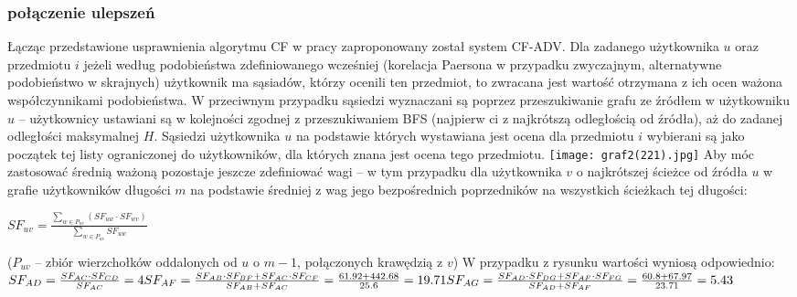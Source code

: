 \documentclass{pracamgr}
\begin{document}
    \subsubsection{połączenie ulepszeń}
     Łącząc przedstawione usprawnienia algorytmu CF w pracy \cite{221} zaproponowany został system CF-ADV.\newline
     Dla zadanego użytkownika $u$ oraz przedmiotu $i$ jeżeli według podobieństwa zdefiniowanego wcześniej
     (korelacja Paersona w przypadku zwyczajnym, alternatywne podobieństwo w skrajnych) użytkownik ma sąsiadów, którzy ocenili ten przedmiot,
     to zwracana jest wartość otrzymana z ich ocen ważona współczynnikami podobieństwa.\newline
     W przeciwnym przypadku sąsiedzi wyznaczani są poprzez przeszukiwanie grafu ze źródłem w użytkowniku $u$
     -- użytkownicy ustawiani są w kolejności zgodnej z przeszukiwaniem BFS (najpierw ci z najkrótszą odległością od źródła),
     aż do zadanej odległości maksymalnej $H$.
     Sąsiedzi użytkownika $u$ na podstawie których wystawiana jest ocena dla przedmiotu $i$
     wybierani są jako początek tej listy ograniczonej do użytkowników, dla których znana jest ocena tego przedmiotu.\newline
     \texttt{[image: graf2(221).jpg]}\newline
     Aby móc zastosować średnią ważoną pozostaje jeszcze zdefiniować wagi
     -- w tym przypadku dla użytkownika $v$ o najkrótszej ścieżce od źródła $u$ w grafie użytkowników długości $m$
     na podstawie średniej z wag jego bezpośrednich poprzedników na wszystkich ścieżkach tej długości:
     \begin{center}
      $SF_{uv}=\frac{\sum_{w\in P_{uv}}(SF_{uw}\cdot SF_{wv})}{\sum_{w\in P_{uv}}SF_{uw}}$
     \end{center}
     {\scriptsize
      ($P_{uv}$ -- zbiór wierzchołków oddalonych od $u$ o $m-1$, połączonych krawędzią z $v$)
     }\newline
     W przypadku z rysunku wartości wyniosą odpowiednio:\newline
     $
     SF_{AD}=\frac{SF_{AC}\cdot SF_{CD}}{SF_{AC}}=4\newline
     SF_{AF}=\frac{SF_{AB}\cdot SF_{BF}+SF_{AC}\cdot SF_{CF}}{SF_{AB}+SF_{AC}}=\frac{61.92+442.68}{25.6}=19.71\newline
     SF_{AG}=\frac{SF_{AD}\cdot SF_{DG}+SF_{AF}\cdot SF_{FG}}{SF_{AD}+SF_{AF}}=\frac{60.8+67.97}{23.71}=5.43\newline
     $
\end{document}
